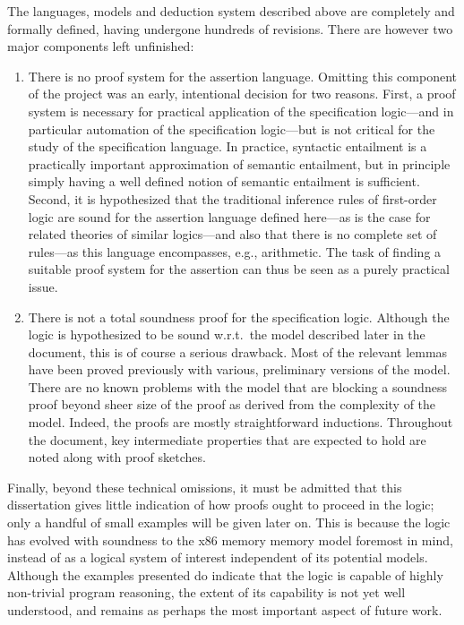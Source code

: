 \documentclass[11pt]{report}
\begin{document}
The languages, models and deduction system described above are completely and formally defined, having undergone hundreds of revisions. There are however two major components left unfinished: 
\begin{enumerate}
  \item There is no proof system for the assertion language. Omitting this component of the project was an early, intentional decision for two reasons. First, a proof system is necessary for practical application of the specification logic---and in particular automation of the specification logic---but is not critical for the study of the specification language. In practice, syntactic entailment is a practically important approximation of semantic entailment, but in principle simply having a well defined notion of semantic entailment is sufficient. Second, it is hypothesized that the traditional inference rules of first-order logic are sound for the assertion language defined here---as is the case for related theories of similar logics---and also that there is no complete set of rules---as this language encompasses, e.g., arithmetic. The task of finding a suitable proof system for the assertion can thus be seen as a purely practical issue.

  \item There is not a total soundness proof for the specification logic. Although the logic is hypothesized to be sound w.r.t.\ the model described later in the document, this is of course a serious drawback. Most of the relevant lemmas have been proved previously with various, preliminary versions of the model. There are no known problems with the model that are blocking a soundness proof beyond sheer size of the proof as derived from the complexity of the model. Indeed, the proofs are mostly straightforward inductions. Throughout the document, key intermediate properties that are expected to hold are noted along with proof sketches. 
\end{enumerate}

Finally, beyond these technical omissions, it must be admitted that this dissertation gives little indication of how proofs ought to proceed in the logic; only a handful of small examples will be given later on. This is because the logic has evolved with soundness to the x86 memory memory model foremost in mind, instead of as a logical system of interest independent of its potential models. Although the examples presented do indicate that the logic is capable of highly non-trivial program reasoning, the extent of its capability is not yet well understood, and remains as perhaps the most important aspect of future work. 
\end{document}
